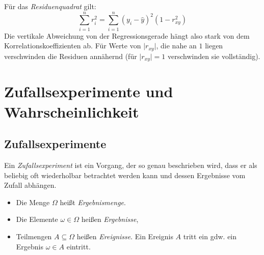 \documentclass[a4paper, 11pt, accentcolor = tud3b]{tudreport}
\newcommand{\abs}[1]{\ensuremath{{\lvert #1 \rvert}}}
\begin{document}
	               	Für das \textit{Residuenquadrat} gilt:
	               	\begin{equation*}
		               	\sum_{i = 1}^{n} r_i^2 = \sum_{i = 1}^{n} (y_i - \hat{y})^2 (1 - r_{xy}^2)
	               	\end{equation*}
	               	Die vertikale Abweichung von der Regressionsgerade hängt also stark von dem Korrelationskoeffizienten ab. Für Werte von \( \abs{r_{xy}} \), die nahe an \(1\) liegen verschwinden die Residuen annähernd (für \( \abs{r_{xy}} = 1 \) verschwinden sie vollständig).

        \section{Zufallsexperimente und Wahrscheinlichkeit}
            \subsection{Zufallsexperimente}
                Ein \textit{Zufallsexperiment} ist ein Vorgang, der so genau beschrieben wird, dass er als beliebig oft wiederholbar betrachtet werden kann und dessen Ergebnisse vom Zufall abhängen.
                
                \begin{itemize}
                	\item Die Menge \(\Omega\) heißt \textit{Ergebnismenge}.
                	\item Die Elemente \(\omega \in \Omega\) heißen \textit{Ergebnisse},
                	\item Teilmengen \(A \subseteq \Omega\) heißen \textit{Ereignisse}. Ein Ereignis \(A\) tritt ein gdw. ein Ergebnis \( \omega \in A \) eintritt.
                \end{itemize}
\end{document}

